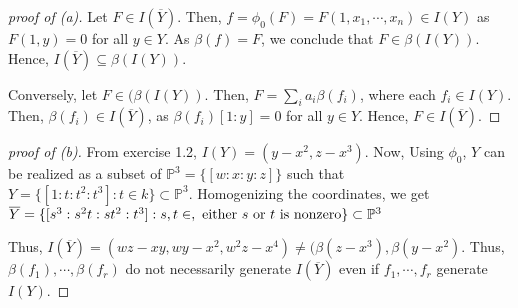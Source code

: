\documentclass[12pt,letterpaper]{article}
\theoremstyle{definition}
\theoremstyle{remark}
\numberwithin{equation}{section}
\numberwithin{figure}{problem}
\let\AA\relax
\DeclareMathOperator{\AA}{\mathbb{A}}
\newcommand{\PP}{\mathbb{P}}
\begin{document}
\begin{proof} [proof of (a)]
  Let $F \in I(\overline{Y})$. Then, $f =\phi_0(F) = F(1,x_1, \cdots, x_n) \in I(Y)$ as $F(1,y) = 0$ for all $y \in Y$. As $\beta(f) = F$, we conclude that $F \in \beta(I(Y))$. Hence, $I(\overline{Y}) \subseteq \beta(I(Y))$. 
  \par Conversely, let $F \in (\beta(I(Y))$. Then, $F = \sum_i a_i \beta(f_i)$, where each $f_i \in I(Y)$. Then, $\beta(f_i) \in I(\overline{Y})$, as $\beta(f_i)[1:y] = 0$ for all $y \in Y$. Hence, $F \in I(\overline{Y})$. 
\end{proof}

\begin{proof} [proof of (b)]
  From exercise 1.2, $I(Y) = (y-x^2, z-x^3)$. Now, Using $\phi_0$, $Y$ can be realized as a subset of $\PP^3= \{[w:x:y:z]\}$ such that $Y = \{[1:t:t^2:t^3]: t \in k \} \subset \PP^3$. Homogenizing the coordinates, we get $\overline{Y} = \{[s^3:s^2t:st^2:t^3]: s,t \in \AA, \mbox{ either } s \mbox{ or } t \mbox{ is nonzero}\} \subset \PP^3$
  \par Thus, $I(\overline{Y}) = (wz - xy, wy -x^2, w^2z-x^4) \neq (\beta(z-x^3), \beta(y-x^2)$. Thus, $\beta(f_1), \cdots, \beta(f_r)$ do not necessarily generate $I(\overline{Y})$ even if $f_1, \cdots, f_r$ generate $I(Y)$.
\end{proof}
\end{document}
